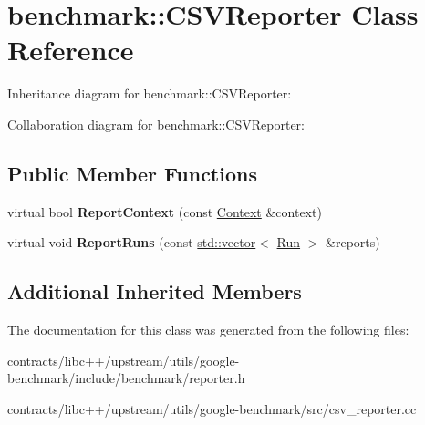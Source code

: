 \hypertarget{classbenchmark_1_1_c_s_v_reporter}{}\section{benchmark\+:\+:C\+S\+V\+Reporter Class Reference}
\label{classbenchmark_1_1_c_s_v_reporter}


Inheritance diagram for benchmark\+:\+:C\+S\+V\+Reporter\+:


Collaboration diagram for benchmark\+:\+:C\+S\+V\+Reporter\+:
\subsection*{Public Member Functions}
\begin{DoxyCompactItemize}
\item 
\mbox{\label{classbenchmark_1_1_c_s_v_reporter_a0bb5fdfaf9fbf41f0fa0bbcd54ef58e3}} 
virtual bool {\bfseries Report\+Context} (const \mbox{\hyperlink{structbenchmark_1_1_benchmark_reporter_1_1_context}{Context}} \&context)
\item 
\mbox{\label{classbenchmark_1_1_c_s_v_reporter_ae1918883447305af6ac2d084b6e24e4c}} 
virtual void {\bfseries Report\+Runs} (const \mbox{\hyperlink{classstd_1_1vector}{std\+::vector}}$<$ \mbox{\hyperlink{structbenchmark_1_1_benchmark_reporter_1_1_run}{Run}} $>$ \&reports)
\end{DoxyCompactItemize}
\subsection*{Additional Inherited Members}


The documentation for this class was generated from the following files\+:\begin{DoxyCompactItemize}
\item 
contracts/libc++/upstream/utils/google-\/benchmark/include/benchmark/reporter.\+h\item 
contracts/libc++/upstream/utils/google-\/benchmark/src/csv\+\_\+reporter.\+cc\end{DoxyCompactItemize}
